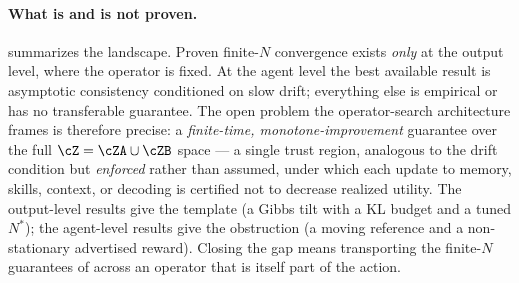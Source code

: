 \paragraph{What is and is not proven.}  summarizes the landscape. Proven finite-$N$ convergence exists \emph{only} at the output level, where the operator is fixed. At the agent level the best available result is asymptotic consistency conditioned on slow drift; everything else is empirical or has no transferable guarantee. The open problem the operator-search architecture frames is therefore precise: a \emph{finite-time, monotone-improvement} guarantee over the full $\cZ = \cZA \cup \cZB$ space — a single trust region, analogous to the drift condition but \emph{enforced} rather than assumed, under which each update to memory, skills, context, or decoding is certified not to decrease realized utility. The output-level results give the template (a Gibbs tilt with a KL budget and a tuned $N^\ast$); the agent-level results give the obstruction (a moving reference and a non-stationary advertised reward). Closing the gap means transporting the finite-$N$ guarantees of  across an operator that is itself part of the action.

